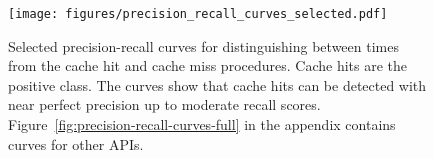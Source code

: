 \begin{figure}
    \centering
    \texttt{[image: figures/precision\_recall\_curves\_selected.pdf]}
    \vspace{-0.3in}
    \caption{Selected precision-recall curves for distinguishing between times from the cache hit and cache miss procedures. Cache hits are the positive class. The curves show that cache hits can be detected with near perfect precision up to moderate recall scores. Figure~\ref{fig:precision-recall-curves-full} in the appendix contains curves for other APIs.}
    \label{fig:precision-recall-curves-selected}
    \vspace{-0.2in}
\end{figure}
